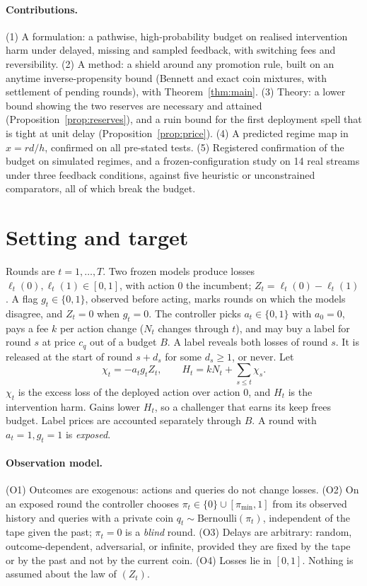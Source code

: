 \documentclass{article}
\theoremstyle{plain}
\theoremstyle{definition}
\begin{document}
\paragraph{Contributions.}
(1) A formulation: a pathwise, high-probability budget on realised intervention harm under delayed, missing and sampled feedback, with switching fees and reversibility.
(2) A method: a shield around any promotion rule, built on an anytime inverse-propensity bound (Bennett and exact coin mixtures, with settlement of pending rounds), with Theorem~\ref{thm:main}.
(3) Theory: a lower bound showing the two reserves are necessary and attained (Proposition~\ref{prop:reserves}), and a ruin bound for the first deployment spell that is tight at unit delay (Proposition~\ref{prop:price}).
(4) A predicted regime map in $x=rd/h$, confirmed on all \RegimeTestsTotal{} pre-stated tests.
(5) Registered confirmation of the budget on \NRegimes{} simulated regimes, and a frozen-configuration study on 14 real streams under three feedback conditions, against five heuristic or unconstrained comparators, all of which break the budget.

\section{Setting and target}\label{sec:setting}
Rounds are $t=1,\dots,T$. Two frozen models produce losses $\ell_t(0),\ell_t(1)\in[0,1]$, with action $0$ the incumbent; $Z_t=\ell_t(0)-\ell_t(1)$. A flag $g_t\in\{0,1\}$, observed before acting, marks rounds on which the models disagree, and $Z_t=0$ when $g_t=0$. The controller picks $a_t\in\{0,1\}$ with $a_0=0$, pays a fee $k$ per action change ($N_t$ changes through $t$), and may buy a label for round $s$ at price $c_q$ out of a budget $B$. A label reveals both losses of round $s$. It is released at the start of round $s+d_s$ for some $d_s\ge1$, or never. Let
\begin{equation*}
\chi_t=-a_tg_tZ_t,\qquad H_t=kN_t+\sum_{s\le t}\chi_s .
\end{equation*}
$\chi_t$ is the excess loss of the deployed action over action $0$, and $H_t$ is the intervention harm. Gains lower $H_t$, so a challenger that earns its keep frees budget. Label prices are accounted separately through $B$. A round with $a_t=1,g_t=1$ is \emph{exposed}.

\paragraph{Observation model.}
(O1) Outcomes are exogenous: actions and queries do not change losses. (O2) On an exposed round the controller chooses $\pi_t\in\{0\}\cup[\pi_{\min},1]$ from its observed history and queries with a private coin $q_t\sim\mathrm{Bernoulli}(\pi_t)$, independent of the tape given the past; $\pi_t=0$ is a \emph{blind} round. (O3) Delays are arbitrary: random, outcome-dependent, adversarial, or infinite, provided they are fixed by the tape or by the past and not by the current coin. (O4) Losses lie in $[0,1]$. Nothing is assumed about the law of $(Z_t)$.
\end{document}
